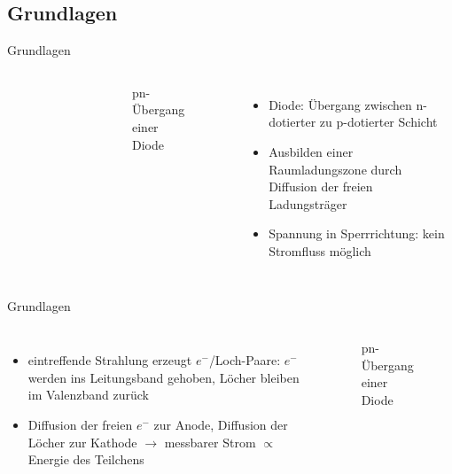 \subsection[]{Grundlagen}

\begin{frame}{Grundlagen}
    \begin{columns}[T]
	    	\vspace{-0.5cm}
			\begin{figure}[htbp]
			  \centering
			  
			\end{figure}
			\vspace{-1.2cm}
			\begin{figure}[htbp]
			  \centering
			   
			   \vspace{-0.5cm}
			  \caption{pn-Übergang einer Diode}
			\end{figure}
			
	    	\begin{itemize}
	    	  \item Diode: Übergang zwischen n-dotierter zu p-dotierter Schicht
			  \item Ausbilden einer Raumladungszone durch Diffusion der freien Ladungsträger
			  \item Spannung in Sperrrichtung: kein Stromfluss möglich
			\end{itemize}
    \end{columns}
\end{frame}

\begin{frame}{Grundlagen}
    \begin{columns}[T]	
	    	\begin{itemize}
	    	  \item eintreffende Strahlung erzeugt $e^-$/Loch-Paare: $e^-$ werden ins Leitungsband
	    	  gehoben, Löcher bleiben im Valenzband zurück
	    	  \item Diffusion der freien $e^-$ zur Anode, Diffusion der Löcher zur Kathode $\rightarrow$
	    	  messbarer Strom $\propto$ Energie des Teilchens
			\end{itemize}
			
			\begin{figure}[htbp]
			  \centering
			   
			  \caption{pn-Übergang einer Diode}
			\end{figure}
    \end{columns}
\end{frame}